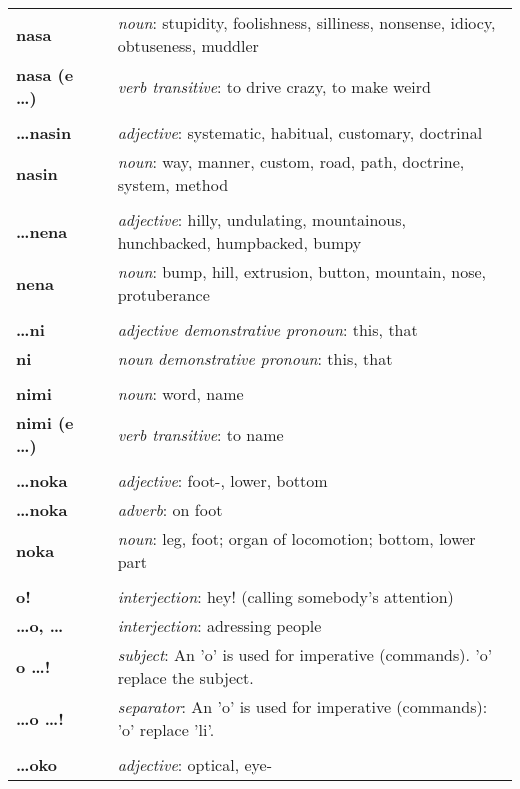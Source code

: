 \begin{supertabular}{p{2,5cm}|ll}
\textbf{nasa} && \textit{noun}: stupidity, foolishness, silliness, nonsense, idiocy, obtuseness, muddler \\ 
\textbf{nasa (e \dots)} && \textit{verb transitive}: to drive crazy, to make weird \\ 
 && \\ %
\textbf{\dots nasin} && \textit{adjective}: systematic, habitual, customary, doctrinal \\ 
\textbf{nasin} && \textit{noun}: way, manner, custom, road, path, doctrine, system, method \\ 
 && \\ %
\textbf{\dots nena} && \textit{adjective}: hilly, undulating, mountainous, hunchbacked, humpbacked, bumpy \\ 
\textbf{nena} && \textit{noun}: bump, hill, extrusion, button, mountain, nose, protuberance \\ 
 && \\ %
\textbf{\dots ni} && \textit{adjective demonstrative pronoun}: this, that \\ 
\textbf{ni} && \textit{noun demonstrative pronoun}: this, that \\ 
 && \\ %
\textbf{nimi} && \textit{noun}: word, name \\ 
\textbf{nimi (e \dots )} && \textit{verb transitive}: to name \\ 
 && \\ %
\textbf{\dots noka} && \textit{adjective}: foot-, lower, bottom \\  
\textbf{ \dots noka } && \textit{adverb}: on foot \\  
\textbf{noka} && \textit{noun}: leg, foot; organ of locomotion; bottom, lower part \\ 
 && \\ %
\textbf{o!} && \textit{interjection}: hey! (calling somebody's attention) \\ 
\textbf{\dots o, \dots} && \textit{interjection}: adressing people \\ 
\textbf{o \dots !} && \textit{subject}: An 'o' is used for imperative (commands). 'o' replace the subject.  \\ 
\textbf{\dots o \dots !} && \textit{separator}: An 'o' is used for imperative (commands): 'o' replace 'li'. \\ 
 && \\ %
\textbf{\dots oko} && \textit{adjective}: optical, eye- \\ 

\end{supertabular}

